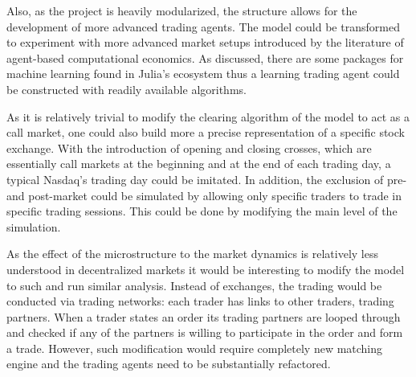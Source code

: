 Also, as the project is heavily modularized, the structure allows for the development of more advanced
trading agents. The model could be transformed to experiment with more advanced
market setups introduced by the literature of agent-based computational economics. As discussed,
there are some packages for machine learning found in Julia's ecosystem thus 
a learning trading agent could be constructed with readily available algorithms.

As it is relatively trivial to modify the clearing algorithm of the model to 
act as a call market, one could also build more a precise representation of a
specific stock exchange. With the introduction of opening and closing crosses,
which are essentially call markets at the beginning and at the end of each 
trading day, a typical Nasdaq's trading day could be imitated. In addition,
the exclusion of pre- and post-market could be simulated by allowing only
specific traders to trade in specific trading sessions. This could be done
by modifying the main level of the simulation. 

As the effect of the microstructure to the market dynamics is relatively 
less understood in decentralized markets it would be interesting to modify 
the model to such and run similar analysis. Instead of exchanges, the trading 
would be conducted via trading networks: each trader has links to other traders, 
trading partners. When a trader states an order its trading partners are 
looped through and checked if any of the partners is willing to participate 
in the order and form a trade. However, such modification would require 
completely new matching engine and the trading agents need to be substantially 
refactored.
